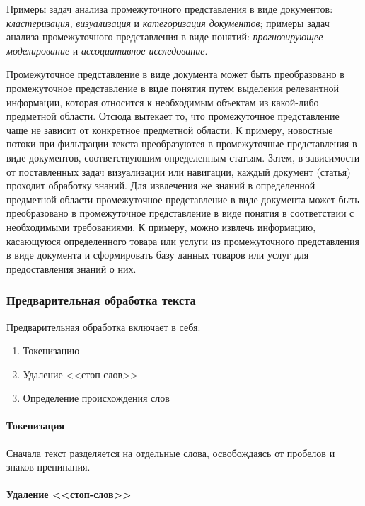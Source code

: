\documentclass[14pt]{matmex-diploma-custom}
\begin{document}
Примеры задач анализа промежуточного представления в виде документов: \emph{кластеризация}, \emph{визуализация} и \emph{категоризация документов}; примеры задач анализа промежуточного представления в виде понятий: \emph{прогнозирующее моделирование} и \emph{ассоциативное исследование}.

Промежуточное представление в виде документа может быть преобразовано в промежуточное представление в виде понятия путем выделения релевантной информации, которая относится к необходимым объектам из какой-либо предметной области. Отсюда вытекает то, что промежуточное представление чаще не зависит от конкретное предметной области. К примеру, новостные потоки при фильтрации текста преобразуются в промежуточные представления в виде документов, соответствующим определенным статьям. Затем, в зависимости от поставленных задач визуализации или навигации, каждый документ (статья) проходит обработку знаний. Для извлечения же знаний в определенной предметной области промежуточное представление в виде документа может быть преобразовано в промежуточное представление в виде понятия в соответствии с необходимыми требованиями. К примеру, можно извлечь информацию, касающуюся определенного товара или услуги из промежуточного представления в виде документа и сформировать базу данных товаров или услуг для предоставления знаний о них.

\subsubsection{Предварительная обработка текста}

Предварительная обработка включает в себя:

\begin{enumerate}
\item Токенизацию
\item Удаление <<стоп-слов>>
\item Определение происхождения слов
\end{enumerate}

\paragraph{Токенизация} 

Сначала текст разделяется на отдельные слова, освобождаясь от пробелов и знаков препинания.

\paragraph{Удаление <<стоп-слов>>}
\end{document}
